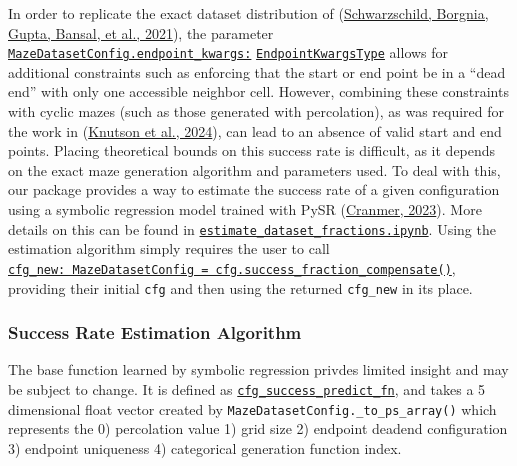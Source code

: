 \documentclass[10pt,a4paper,onecolumn]{article}
\begin{document}
In order to replicate the exact dataset distribution of
(\protect\hyperlink{ref-easy_to_hard}{Schwarzschild, Borgnia, Gupta,
Bansal, et al., 2021}), the parameter
\href{https://understanding-search.github.io/maze-dataset/maze_dataset/dataset/maze_dataset_config.html\#MazeDatasetConfig.endpoint_kwargs}{\texttt{MazeDatasetConfig.endpoint\_kwargs:}}
\href{https://understanding-search.github.io/maze-dataset/maze_dataset/dataset/maze_dataset_config.html\#EndpointKwargsType}{\texttt{EndpointKwargsType}}
allows for additional constraints such as enforcing that the start or
end point be in a ``dead end'' with only one accessible neighbor cell.
However, combining these constraints with cyclic mazes (such as those
generated with percolation), as was required for the work in
(\protect\hyperlink{ref-knutson2024logicalextrapolation}{Knutson et al.,
2024}), can lead to an absence of valid start and end points. Placing
theoretical bounds on this success rate is difficult, as it depends on
the exact maze generation algorithm and parameters used. To deal with
this, our package provides a way to estimate the success rate of a given
configuration using a symbolic regression model trained with PySR
(\protect\hyperlink{ref-pysr}{Cranmer, 2023}). More details on this can
be found in
\href{https://understanding-search.github.io/maze-dataset/notebooks/estimate_dataset_fractions.html}{\texttt{estimate\_dataset\_fractions.ipynb}}.
Using the estimation algorithm simply requires the user to call
\href{https://understanding-search.github.io/maze-dataset/maze_dataset.html\#MazeDatasetConfig.success_fraction_compensate}{\texttt{cfg\_new:\ MazeDatasetConfig\ =\ cfg.success\_fraction\_compensate()}},
providing their initial \texttt{cfg} and then using the returned
\texttt{cfg\_new} in its place.

\hypertarget{success-rate-estimation-algorithm}{%
\subsubsection{Success Rate Estimation
Algorithm}\label{success-rate-estimation-algorithm}}

The base function learned by symbolic regression privdes limited insight
and may be subject to change. It is defined as
\href{https://understanding-search.github.io/maze-dataset/maze_dataset/dataset/success_predict_math.html\#cfg_success_predict_fn}{\texttt{cfg\_success\_predict\_fn}},
and takes a 5 dimensional float vector created by
\texttt{MazeDatasetConfig.\_to\_ps\_array()} which represents the 0)
percolation value 1) grid size 2) endpoint deadend configuration 3)
endpoint uniqueness 4) categorical generation function index.
\end{document}

